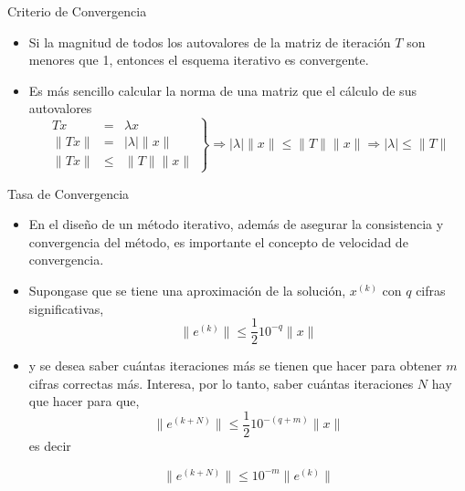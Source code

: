 \documentclass[10pt]{beamer}
\begin{document}
    \begin{frame}{Criterio de Convergencia}
    \begin{itemize}
     \item Si la magnitud de todos los autovalores de la matriz de iteraci\'on $T$ son menores que 1, entonces el esquema iterativo es convergente.
     \item<3-> Es m\'as sencillo calcular la norma de una matriz que el c\'alculo de sus autovalores
     $$
     \left.\begin{array}{lcl}
            Tx & = & \lambda x \\
            \|Tx\| & = & |\lambda|\|x\|\\
            \|Tx\| & \leq & \|T\|\|x\|
           \end{array}\right\} \Rightarrow |\lambda|\|x\| \leq \|T\|\|x\| \Rightarrow |\lambda| \leq \|T\|
     $$
    \end{itemize}
    \end{frame}
    \begin{frame}{Tasa de Convergencia}
    \begin{itemize}
    \item<1-> En el dise\~no de un m\'etodo iterativo, adem\'as de asegurar la consistencia y convergencia del m\'etodo, es importante el concepto de velocidad de convergencia.
    \item<2-> Supongase que se tiene una aproximaci\'on de la soluci\'on, $x^{(k)}$ con $q$ cifras significativas,
    $$
    \|e^{(k)}\| \leq \frac{1}{2}10^{-q}\|x\|
    $$
    \item<3-> y se desea saber cu\'antas iteraciones m\'as se tienen que hacer para obtener $m$ cifras correctas m\'as. Interesa, por lo tanto, saber cu\'antas iteraciones $N$ hay que hacer para que,
    $$
    \|e^{(k+N)}\| \leq \frac{1}{2}10^{-(q+m)}\|x\|
    $$
    es decir
    \begin{block}{}
     $$
    \|e^{(k+N)}\| \leq 10^{-m}\|e^{(k)}\|
    $$
    \end{block}
    \end{itemize}
    \end{frame}
\end{document}
